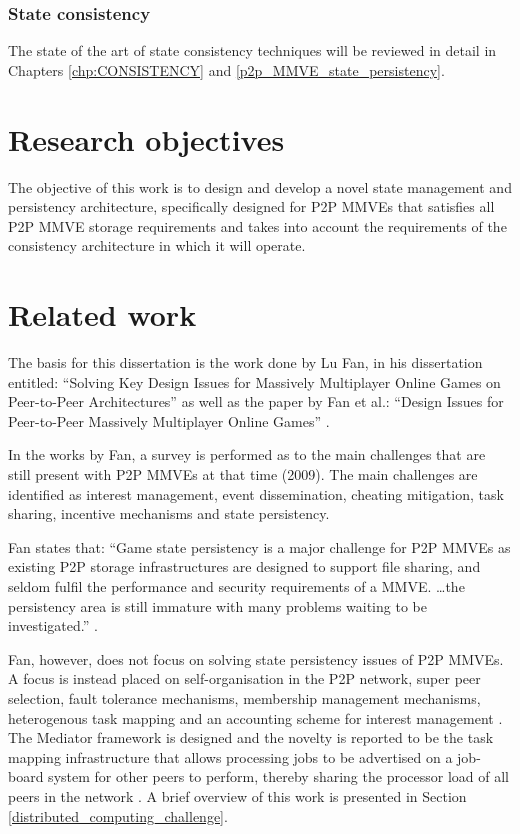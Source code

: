 \subsubsection{State consistency}

The state of the art of state consistency techniques will be reviewed in detail in Chapters \ref{chp:CONSISTENCY} and \ref{p2p_MMVE_state_persistency}.

\section{Research objectives}

The objective of this work is to design and develop a novel state management and persistency architecture, specifically designed for P2P MMVEs that satisfies all P2P MMVE storage requirements and takes into account the requirements of the consistency architecture in which it will operate.

\section{Related work}
\label{intro_related_work}

The basis for this dissertation is the work done by Lu Fan, in his dissertation entitled: ``Solving Key Design Issues for Massively Multiplayer Online Games on Peer-to-Peer Architectures'' \cite{Fan_phd} as well as the paper by Fan et al.: ``Design Issues for Peer-to-Peer Massively Multiplayer Online Games'' \cite{Fan_deisgn_issues_p2p}.

In the works by Fan, a survey is performed as to the main challenges that are still present with P2P MMVEs at that time (2009). The main challenges are identified as interest management, event dissemination, cheating mitigation, task sharing, incentive mechanisms and state persistency.

Fan states that: ``Game state persistency is a major challenge for P2P MMVEs as existing P2P storage infrastructures are designed to support file sharing, and seldom fulfil the performance and security requirements of a MMVE. \ldots the persistency area is still immature with many problems waiting to be investigated.'' \cite{Fan_phd}.

Fan, however, does not focus on solving state persistency issues of P2P MMVEs. A focus is instead placed on self-organisation in the P2P network, super peer selection, fault tolerance mechanisms, membership management mechanisms, heterogenous task mapping and an accounting scheme for interest management \cite{Fan_phd}. The Mediator framework is designed and the novelty is reported to be the task mapping infrastructure that allows processing jobs to be advertised on a job-board system for other peers to perform, thereby sharing the processor load of all peers in the network \cite{fan_mediator_paper}. A brief overview of this work is presented in Section \ref{distributed_computing_challenge}.

